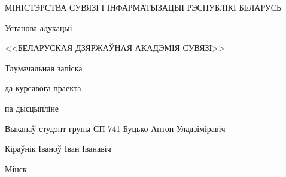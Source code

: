 \begin{TitlePage}
    МІНІСТЭРСТВА СУВЯЗІ І ІНФАРМАТЫЗАЦЫІ РЭСПУБЛІКІ БЕЛАРУСЬ

    Установа адукацыі

    <<БЕЛАРУСКАЯ ДЗЯРЖАЎНАЯ АКАДЭМІЯ СУВЯЗІ>>

    \faculty{\telecommunication}

    \department{\software}

    \vspace{5cm}
    

    \vspace{\baselineskip}

    Тлумачальная запіска

    да курсавога праекта

    па дысцыпліне

    
    \vspace{6.5cm}

    Выканаў студэнт групы СП 741 \hfill Буцько Антон Уладзіміравіч

    \vspace{\baselineskip}

    Кіраўнік \hfill Іваноў Іван Іванавіч

    \vfill

    Мінск \the\year
\end{TitlePage}
